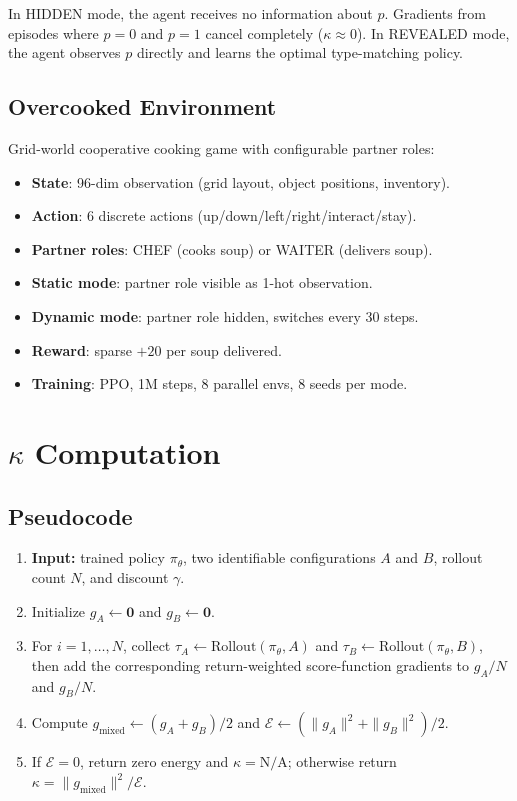 \documentclass[letterpaper]{article}
\begin{document}
In HIDDEN mode, the agent receives no information about $p$.
Gradients from episodes where $p=0$ and $p=1$ cancel completely ($\kappa \approx 0$).
In REVEALED mode, the agent observes $p$ directly and learns the optimal
type-matching policy.

\subsection{Overcooked Environment}

Grid-world cooperative cooking game with configurable partner roles:

\begin{itemize}
\item \textbf{State}: 96-dim observation (grid layout, object positions, inventory).
\item \textbf{Action}: 6 discrete actions (up/down/left/right/interact/stay).
\item \textbf{Partner roles}: CHEF (cooks soup) or WAITER (delivers soup).
\item \textbf{Static mode}: partner role visible as 1-hot observation.
\item \textbf{Dynamic mode}: partner role hidden, switches every 30 steps.
\item \textbf{Reward}: sparse $+20$ per soup delivered.
\item \textbf{Training}: PPO, 1M steps, 8 parallel envs, 8 seeds per mode.
\end{itemize}

\section{$\kappa$ Computation}

\subsection{Pseudocode}

\begin{enumerate}
\item \textbf{Input:} trained policy $\pi_\theta$, two identifiable
  configurations $A$ and $B$, rollout count $N$, and discount $\gamma$.
\item Initialize $g_A\gets\mathbf{0}$ and $g_B\gets\mathbf{0}$.
\item For $i=1,\ldots,N$, collect
  $\tau_A\gets\mathrm{Rollout}(\pi_\theta,A)$ and
  $\tau_B\gets\mathrm{Rollout}(\pi_\theta,B)$, then add the corresponding
  return-weighted score-function gradients to $g_A/N$ and $g_B/N$.
\item Compute
  $g_{\mathrm{mixed}}\gets(g_A+g_B)/2$ and
  $\mathcal{E}\gets(\|g_A\|^2+\|g_B\|^2)/2$.
\item If $\mathcal{E}=0$, return zero energy and $\kappa=\mathrm{N/A}$;
  otherwise return $\kappa=\|g_{\mathrm{mixed}}\|^2/\mathcal{E}$.
\end{enumerate}
\end{document}
